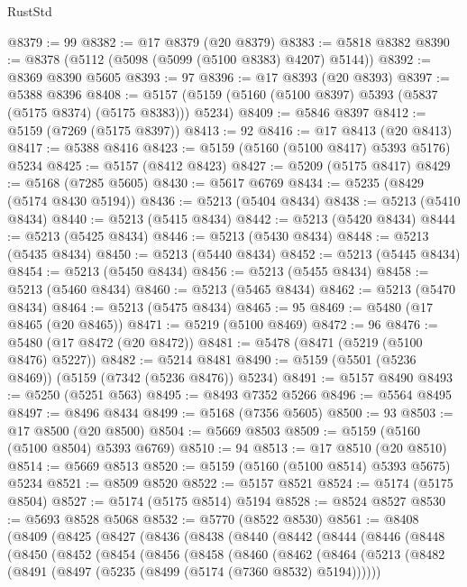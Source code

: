 \begin{lexlean}{RustStd}
\begin{coremodule}
@8379 := 99
@8382 := @17 @8379 (@20 @8379)
@8383 := @5818 @8382
@8390 := @8378 (@5112 (@5098 (@5099 (@5100 @8383) @4207) @5144))
@8392 := @8369 @8390 @5605
@8393 := 97
@8396 := @17 @8393 (@20 @8393)
@8397 := @5388 @8396
@8408 := @5157 (@5159 (@5160 (@5100 @8397) @5393 (@5837 (@5175 @8374) (@5175 @8383))) @5234)
@8409 := @5846 @8397
@8412 := @5159 (@7269 (@5175 @8397))
@8413 := 92
@8416 := @17 @8413 (@20 @8413)
@8417 := @5388 @8416
@8423 := @5159 (@5160 (@5100 @8417) @5393 @5176) @5234
@8425 := @5157 (@8412 @8423)
@8427 := @5209 (@5175 @8417)
@8429 := @5168 (@7285 @5605)
@8430 := @5617 @6769
@8434 := @5235 (@8429 (@5174 @8430 @5194))
@8436 := @5213 (@5404 @8434)
@8438 := @5213 (@5410 @8434)
@8440 := @5213 (@5415 @8434)
@8442 := @5213 (@5420 @8434)
@8444 := @5213 (@5425 @8434)
@8446 := @5213 (@5430 @8434)
@8448 := @5213 (@5435 @8434)
@8450 := @5213 (@5440 @8434)
@8452 := @5213 (@5445 @8434)
@8454 := @5213 (@5450 @8434)
@8456 := @5213 (@5455 @8434)
@8458 := @5213 (@5460 @8434)
@8460 := @5213 (@5465 @8434)
@8462 := @5213 (@5470 @8434)
@8464 := @5213 (@5475 @8434)
@8465 := 95
@8469 := @5480 (@17 @8465 (@20 @8465))
@8471 := @5219 (@5100 @8469)
@8472 := 96
@8476 := @5480 (@17 @8472 (@20 @8472))
@8481 := @5478 (@8471 (@5219 (@5100 @8476) @5227))
@8482 := @5214 @8481
@8490 := @5159 (@5501 (@5236 @8469)) (@5159 (@7342 (@5236 @8476)) @5234)
@8491 := @5157 @8490
@8493 := @5250 (@5251 @563)
@8495 := @8493 @7352 @5266
@8496 := @5564 @8495
@8497 := @8496 @8434
@8499 := @5168 (@7356 @5605)
@8500 := 93
@8503 := @17 @8500 (@20 @8500)
@8504 := @5669 @8503
@8509 := @5159 (@5160 (@5100 @8504) @5393 @6769)
@8510 := 94
@8513 := @17 @8510 (@20 @8510)
@8514 := @5669 @8513
@8520 := @5159 (@5160 (@5100 @8514) @5393 @5675) @5234
@8521 := @8509 @8520
@8522 := @5157 @8521
@8524 := @5174 (@5175 @8504)
@8527 := @5174 (@5175 @8514) @5194
@8528 := @8524 @8527
@8530 := @5693 @8528 @5068
@8532 := @5770 (@8522 @8530)
@8561 := @8408
    (@8409
      (@8425
        (@8427
          (@8436
            (@8438
              (@8440
                (@8442
                  (@8444
                    (@8446
                      (@8448
                        (@8450
                          (@8452
                            (@8454
                              (@8456
                                (@8458
                                  (@8460
                                    (@8462
                                      (@8464
                                        (@5213
                                          (@8482
                                            (@8491
                                              (@8497 (@5235 (@8499 (@5174 (@7360 @8532) @5194))))))

\end{coremodule}
\end{lexlean}
